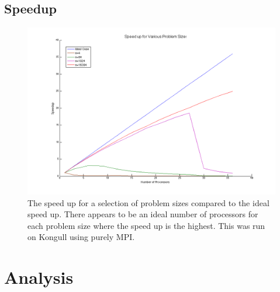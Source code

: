 \documentclass{article}
\begin{document}
\subsection{Speedup}
	
	\begin{figure}[htbp]
	\begin{center}
	\includegraphics[width=15cm,keepaspectratio=true]{figs/speedup}
	\caption{The speed up for a selection of problem sizes compared to the ideal speed up. There appears to be an ideal number of processors for each problem size where the speed up is the highest. This was run on Kongull using purely MPI.}
	\label{fig:speedup}
	\end{center}
	\end{figure}



	

\section{Analysis}
\end{document}
